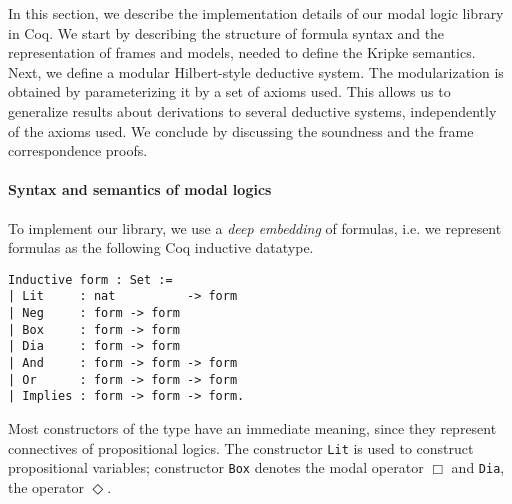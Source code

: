 \documentclass[sigconf,anonymous]{acmart}
\begin{document}
In this section, we describe the implementation details of our modal logic
library in Coq. We start by describing the structure of formula syntax and the
representation of frames and models, needed to define the Kripke semantics.
Next, we define a modular Hilbert-style deductive system. The modularization is
obtained by parameterizing it by a set of axioms used. This allows us to
generalize results about derivations to several deductive systems, independently
of the axioms used. We conclude by discussing the soundness and the frame
correspondence proofs.

\paragraph{Syntax and semantics of modal logics}
To implement our library, we use a \emph{deep embedding} of
formulas, i.e. we represent formulas as the following Coq inductive datatype.
\begin{verbatim}
Inductive form : Set :=
| Lit     : nat          -> form
| Neg     : form -> form
| Box     : form -> form
| Dia     : form -> form
| And     : form -> form -> form
| Or      : form -> form -> form
| Implies : form -> form -> form.
\end{verbatim}
Most constructors of the type have an immediate meaning, since they represent
connectives of propositional logics. The constructor \texttt{Lit}
is used to construct propositional variables; constructor \texttt{Box}
denotes the modal operator $\Box$ and \texttt{Dia}, the operator
$\Diamond$.
\end{document}
